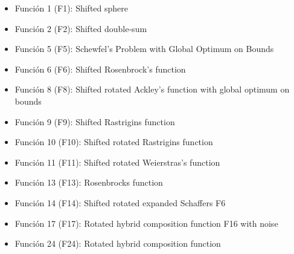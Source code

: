 \documentclass[11pt,a4paper]{article}
\begin{document}
	\begin{itemize}
		
		\item Función 1 (F1): Shifted sphere
		
		\item Función 2 (F2): Shifted double-sum
		
		\item Función 5 (F5): Schewfel's Problem with Global Optimum on Bounds
		
		\item Función 6 (F6): Shifted Rosenbrock's function
		
		\item Función 8 (F8): Shifted rotated Ackley's function with global optimum on bounds
		
		\item Función 9 (F9): Shifted Rastrigins function
		
		\item Función 10 (F10): Shifted rotated Rastrigins function
		
		\item Función 11 (F11): Shifted rotated Weierstras's function
		
		\item Función 13 (F13): Rosenbrocks function
		
		\item Función 14 (F14): Shifted rotated expanded Schaffers F6
		
		\item Función 17 (F17): Rotated hybrid composition function F16 with noise
		
		\item Función 24 (F24): Rotated hybrid composition function
		
	\end{itemize}
	
	
	
	
\end{document}
